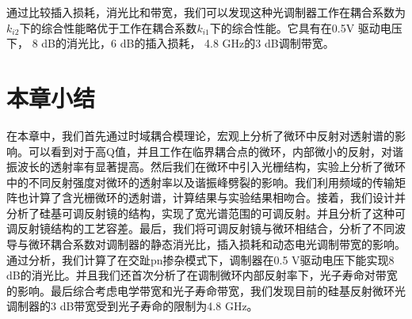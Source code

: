 通过比较插入损耗，消光比和带宽，我们可以发现这种光调制器工作在耦合系数为$k_{i2}$下的综合性能略优于工作在耦合系数$k_{i1}$下的综合性能。它具有在0.5V 驱动电压下， 8 dB的消光比，6 dB的插入损耗， 4.8 GHz的3 dB调制带宽。

\section{本章小结}
在本章中，我们首先通过时域耦合模理论，宏观上分析了微环中反射对透射谱的影响。可以看到对于高Q值，并且工作在临界耦合点的微环，内部微小的反射，对谐振波长的透射率有显著提高。然后我们在微环中引入光栅结构，实验上分析了微环中的不同反射强度对微环的透射率以及谐振峰劈裂的影响。我们利用频域的传输矩阵也计算了含光栅微环的透射谱，计算结果与实验结果相吻合。接着，我们设计并分析了硅基可调反射镜的结构，实现了宽光谱范围的可调反射。并且分析了这种可调反射镜结构的工艺容差。最后，我们将可调反射镜与微环相结合，分析了不同波导与微环耦合系数对调制器的静态消光比，插入损耗和动态电光调制带宽的影响。通过分析，我们计算了在交趾pn掺杂模式下，调制器在0.5 V驱动电压下能实现8 dB的消光比。并且我们还首次分析了在调制微环内部反射率下，光子寿命对带宽的影响。最后综合考虑电学带宽和光子寿命带宽，我们发现目前的硅基反射微环光调制器的3 dB带宽受到光子寿命的限制为4.8 GHz。

